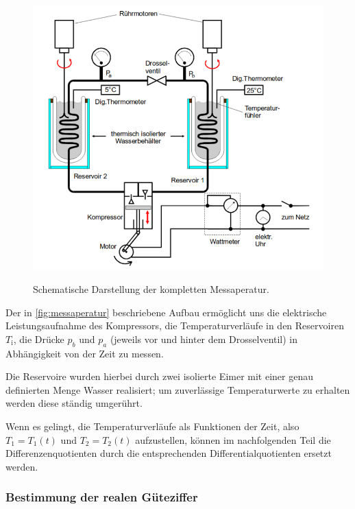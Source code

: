\begin{figure}[H]
	\centering
	\includegraphics{content/messaperatur.pdf}
	\caption{Schematische Darstellung der kompletten Messaperatur.}
	\cite{anleitung}
	\label{fig:messaperatur}
\end{figure}

Der in \autoref{fig:messaperatur} beschriebene Aufbau erm\"oglicht uns 
die elektrische Leistungsaufnahme des Kompressors,
die Temperaturverl\"aufe in den Reservoiren $T_\text{i}$, 
die Dr\"ucke $p_b$ und $p_a$ (jeweils vor und hinter dem Drosselventil)
in Abh\"angigkeit von der Zeit zu messen.

Die Reservoire wurden hierbei durch zwei isolierte Eimer mit einer genau
definierten Menge Wasser realisiert; um zuverl\"assige Temperaturwerte zu erhalten
werden diese st\"andig umger\"uhrt.

Wenn es gelingt, die Temperaturverl\"aufe als Funktionen der Zeit, also $T_1 = T_1(t)$ und
$T_2 = T_2(t)$ aufzustellen, k\"onnen im nachfolgenden Teil die Differenzenquotienten durch
die entsprechenden Differentialquotienten ersetzt werden.

\subsubsection{Bestimmung der realen Güteziffer}

